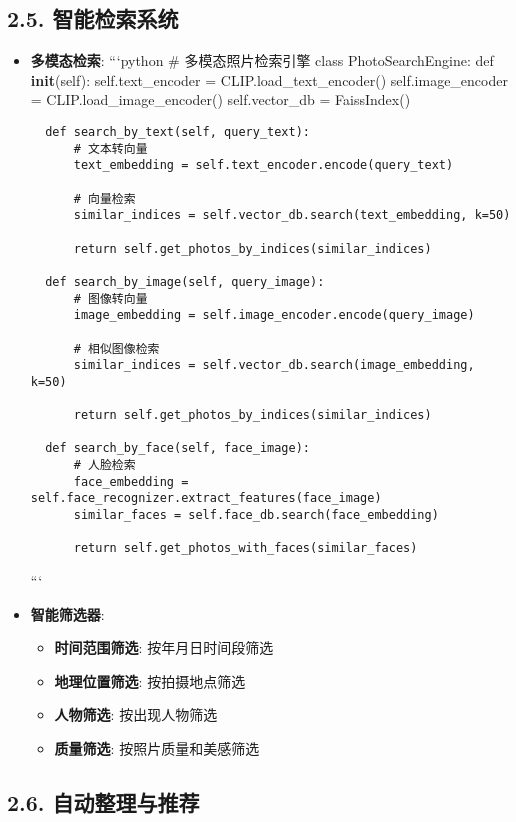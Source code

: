 \subsection{2.5.
智能检索系统}\label{ux667aux80fdux68c0ux7d22ux7cfbux7edf}

\begin{itemize}
\item
  \textbf{多模态检索}: ```python \# 多模态照片检索引擎 class
  PhotoSearchEngine: def \textbf{init}(self): self.text\_encoder =
  CLIP.load\_text\_encoder() self.image\_encoder =
  CLIP.load\_image\_encoder() self.vector\_db = FaissIndex()

\begin{lstlisting}
  def search_by_text(self, query_text):
      # 文本转向量
      text_embedding = self.text_encoder.encode(query_text)

      # 向量检索
      similar_indices = self.vector_db.search(text_embedding, k=50)

      return self.get_photos_by_indices(similar_indices)

  def search_by_image(self, query_image):
      # 图像转向量
      image_embedding = self.image_encoder.encode(query_image)

      # 相似图像检索
      similar_indices = self.vector_db.search(image_embedding, k=50)

      return self.get_photos_by_indices(similar_indices)

  def search_by_face(self, face_image):
      # 人脸检索
      face_embedding = self.face_recognizer.extract_features(face_image)
      similar_faces = self.face_db.search(face_embedding)

      return self.get_photos_with_faces(similar_faces)
\end{lstlisting}

  ```
\item
  \textbf{智能筛选器}:

  \begin{itemize}
  \tightlist
  \item
    \textbf{时间范围筛选}: 按年月日时间段筛选
  \item
    \textbf{地理位置筛选}: 按拍摄地点筛选
  \item
    \textbf{人物筛选}: 按出现人物筛选
  \item
    \textbf{质量筛选}: 按照片质量和美感筛选
  \end{itemize}
\end{itemize}

\subsection{2.6.
自动整理与推荐}\label{ux81eaux52a8ux6574ux7406ux4e0eux63a8ux8350}

